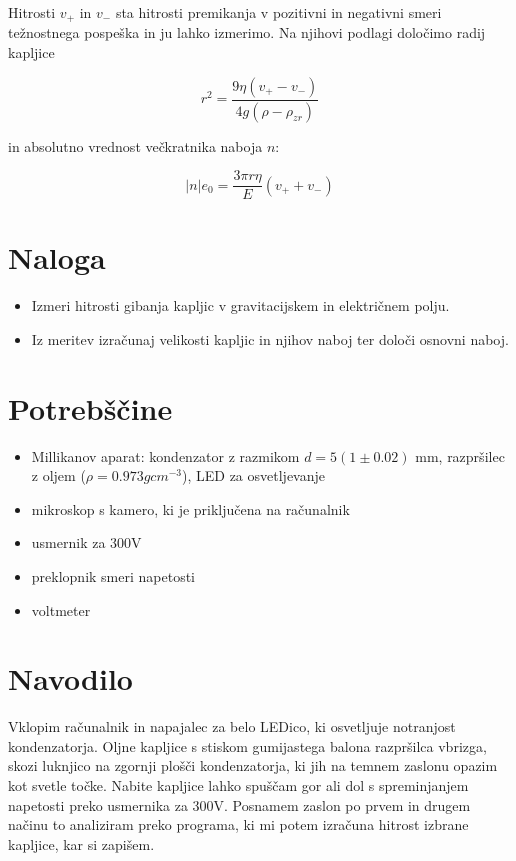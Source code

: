 \documentclass[12pt]{report}
\begin{document}
Hitrosti $v_+$ in $v_-$ sta hitrosti premikanja v pozitivni in negativni smeri težnostnega pospeška in ju lahko izmerimo. Na njihovi podlagi določimo radij kapljice 

\begin{equation}
  r^2 = \frac{9\eta (v_+ - v_-)}{4g(\rho - \rho_{zr})}
\end{equation}

in absolutno vrednost večkratnika naboja $n$: 

\begin{equation}
  |n|e_0 = \frac{3\pi r \eta}{E}(v_+ + v_-)
\end{equation}
  
\chapter*{Naloga}

\begin{itemize}
  \item Izmeri hitrosti gibanja kapljic v gravitacijskem in električnem polju. 
  \item Iz meritev izračunaj velikosti kapljic in njihov naboj ter določi osnovni naboj. 
\end{itemize}


\begingroup
\let\clearpage\relax

\chapter*{Potrebščine}
\begin{itemize}
  \item Millikanov aparat: kondenzator z razmikom $d = 5(1 \pm 0.02)$ mm, razpršilec z oljem ($\rho = 0.973g cm^{-3}$), LED za osvetljevanje 
  \item mikroskop s kamero, ki je priključena na računalnik 
  \item usmernik za 300V
  \item preklopnik smeri napetosti 
  \item voltmeter
\end{itemize}

\chapter*{Navodilo}

Vklopim računalnik in napajalec za belo LEDico, ki osvetljuje notranjost kondenzatorja. Oljne kapljice s stiskom gumijastega balona razpršilca vbrizga, skozi luknjico na zgornji plošči kondenzatorja, ki jih na temnem zaslonu opazim kot svetle točke. Nabite kapljice lahko spuščam gor ali dol s spreminjanjem napetosti preko usmernika za 300V. Posnamem zaslon po prvem in drugem načinu to analiziram preko programa, ki mi potem izračuna hitrost izbrane kapljice, kar si zapišem. 
\end{document}
